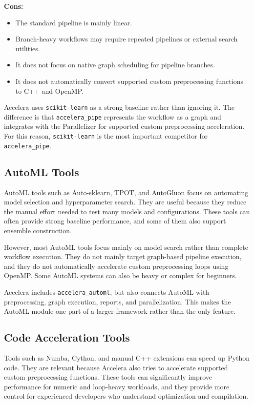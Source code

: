 \documentclass[12pt,a4paper]{report}
\begin{document}
\textbf{Cons:}
\begin{itemize}
  \item The standard pipeline is mainly linear.
  \item Branch-heavy workflows may require repeated pipelines or external search
  utilities.
  \item It does not focus on native graph scheduling for pipeline branches.
  \item It does not automatically convert supported custom preprocessing
  functions to C++ and OpenMP.
\end{itemize}

Accelera uses \texttt{scikit-learn} as a strong baseline rather than ignoring
it. The difference is that \texttt{accelera\_pipe} represents the workflow as a
graph and integrates with the Parallelizer for supported custom preprocessing
acceleration. For this reason, \texttt{scikit-learn} is the most important
competitor for \texttt{accelera\_pipe}.


\subsection{AutoML Tools}

AutoML tools such as Auto-sklearn, TPOT, and AutoGluon focus on automating model
selection and hyperparameter search. They are useful because they reduce the
manual effort needed to test many models and configurations. These tools can
often provide strong baseline performance, and some of them also support
ensemble construction.

\medskip
\noindent However, most AutoML tools focus mainly on model search rather than complete
workflow execution. They do not mainly target graph-based pipeline execution,
and they do not automatically accelerate custom preprocessing loops using
OpenMP. Some AutoML systems can also be heavy or complex for beginners.

\medskip
\noindent Accelera includes \texttt{accelera\_automl}, but also connects AutoML with
preprocessing, graph execution, reports, and parallelization. This makes the
AutoML module one part of a larger framework rather than the only feature.


\subsection{Code Acceleration Tools}

Tools such as Numba, Cython, and manual C++ extensions can speed up Python code.
They are relevant because Accelera also tries to accelerate supported custom
preprocessing functions. These tools can significantly improve performance for
numeric and loop-heavy workloads, and they provide more control for experienced
developers who understand optimization and compilation.
\end{document}
